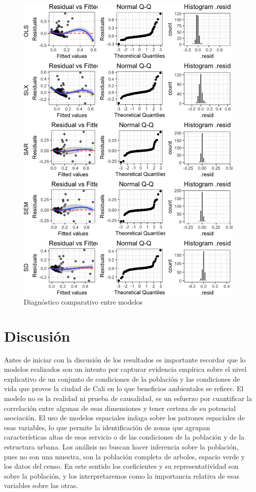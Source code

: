 \documentclass[12pt,]{book}
\begin{document}
\begin{figure}
\includegraphics[width=1\linewidth]{tesis-unigis_files/figure-latex/diag-model-areasdist-espaciales-1} \caption{Diagnóstico comparativo entre modelos}\label{fig:diag-model-areasdist-espaciales}
\end{figure}

\chapter{Discusión}\label{discusion}

Antes de iniciar con la discusión de los resultados es importante
recordar que lo modelos realizados son un intento por capturar evidencia
empírica sobre el nivel explicativo de un conjunto de condiciones de la
población y las condiciones de vida que provee la ciudad de Cali en lo
que beneficios ambientales se refiere. El modelo no es la realidad ni
prueba de causalidad, es un esfuerzo por cuantificar la correlación
entre algunas de esas dimensiones y tener certeza de su potencial
asociación. El uso de modelos espaciales indaga sobre los patrones
espaciales de esas variables, lo que permite la identificación de zonas
que agrupan características altas de esos servicio o de las condiciones
de la población y de la estructura urbana. Los análisis no buscan hacer
inferencia sobre la población, pues no son una muestra, son la población
completa de arboles, espacio verde y los datos del censo. En este
sentido los coeficientes y su representatividad son sobre la población,
y los interpretaremos como la importancia relativa de esas variables
sobre las otras.
\end{document}
